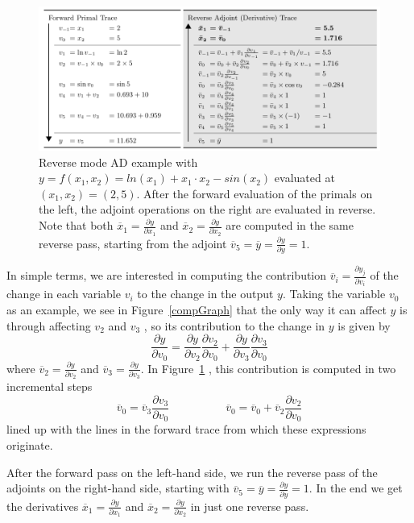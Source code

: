 \begin{figure}[h!]
	\centering \includegraphics[scale=0.47]{img/revMode}
	\caption{Reverse mode AD example with $y=f(x_1,x_2)= ln(x_1)+ x_1 \cdot x_2 -sin(x_2)$ evaluated at $(x_1,x_2)=(2,5)$. After the forward evaluation of the primals on the left, the adjoint operations on the right are evaluated in reverse. Note that both $\overline{x}_1=\frac{\partial y}{\partial x_1}$ and $\overline{x}_2=\frac{\partial y}{\partial x_2}$ are computed in the same reverse pass, starting from the adjoint  $\overline{v}_5=\overline{y}=\frac{\partial y}{\partial y}=1$.}
	\label{revMode}
\end{figure}

In simple terms, we are interested in computing the contribution $\overline{v}_i=\frac{\partial y_j}{\partial v_i}$ of the change in each variable $v_i$ to the change in the output $y$. Taking the variable $v_0$ as an example, we see in Figure~\ref{compGraph} that the only way it can affect $y$ is through affecting $v_2$ and $v_3$ , so its contribution to the change in $y$ is given by
$$ 
	\frac{\partial y}{\partial v_0} = \frac{\partial y}{\partial v_2} \frac{\partial v_2}{\partial v_0} +\frac{\partial y}{\partial v_3} \frac{\partial 		v_3}{\partial v_0}
$$
\noindent where $\overline{v}_2=\frac{\partial y}{\partial v_2}$ and  $\overline{v}_3=\frac{\partial y}{\partial v_3}$. In Figure~\ref{revMode} , this contribution is computed in two incremental steps
$$
	\overline{v}_0=\overline{v}_3 \frac{\partial v_3}{\partial v_0} \quad \quad\quad\quad\quad \overline{v}_0= \overline{v}_0 + \overline{v}_2 \frac{\partial 		v_2}{\partial v_0}
$$
lined up with the lines in the forward trace from which these expressions originate.

After the forward pass on the left-hand side, we run the reverse pass of the adjoints on the right-hand side, starting with $\overline{v}_5=\overline{y}=\frac{\partial y}{\partial y}=1$. In the end we get the derivatives $\overline{x}_1=\frac{\partial y}{\partial x_1}$ and $\overline{x}_2=\frac{\partial y}{\partial x_2}$ in just one reverse pass.

